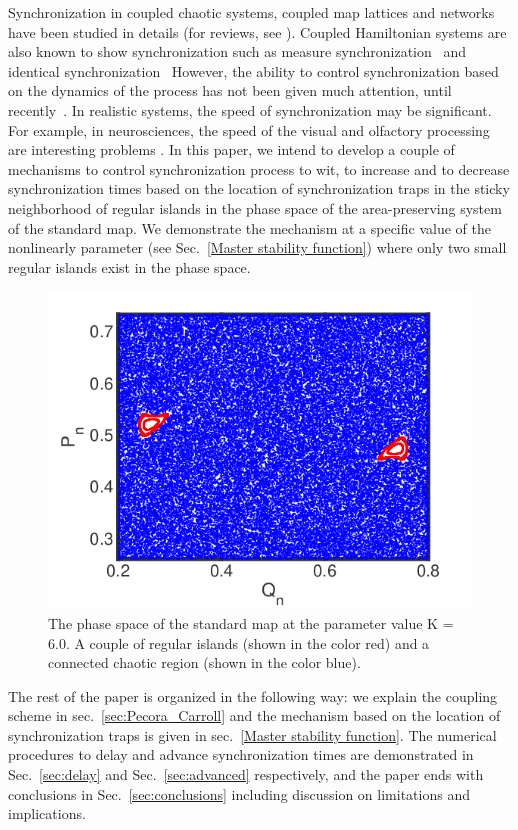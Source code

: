 \documentclass[reprint,amsmath,amssymb,aps,pre]{revtex4-1}
\begin{document}
Synchronization in coupled chaotic systems, coupled map lattices and networks 
have been studied in details (for reviews, see 
\cite{Pecora1998,Boccaletti2002, Pecora2015}). 
Coupled Hamiltonian systems are also known to show synchronization such as 
measure synchronization~\cite{Hampton1999,Wang2003,Vincent2005,Gupta2017} and 
identical synchronization~\cite{Mahata2016,Das2017} However, the ability to control synchronization based on the dynamics of the process has not been given much attention, until 
recently~\cite{Grabow2011,Wang2016}. In realistic systems, the speed of 
synchronization may be significant. For example, in
neurosciences,  the speed of the visual and olfactory processing are 
interesting problems \cite{Thorpe1996,Uchida2003}. In this paper, we intend 
to develop a couple of 
mechanisms to control synchronization process to wit,  to increase and to 
decrease synchronization times based on the location of synchronization traps 
in the sticky neighborhood of regular islands in the phase space of the 
area-preserving system of the standard map. We demonstrate the mechanism at a specific value of the nonlinearly parameter (see Sec.~\ref{Master stability function}) where only two small regular islands exist in the phase space. 
\begin{figure}[t]
	\includegraphics[scale=.45]{Standard_Map.png}
	\caption{\label{fig:Standard_map} \footnotesize The phase space of the standard map at the parameter value K = 6.0. A couple of regular islands (shown in the color red) and a connected chaotic region (shown in the color blue). }
\end{figure}
The rest of the paper is organized in the following way: we explain the 
coupling scheme in sec.~\ref{sec:Pecora_Carroll} and the mechanism based on 
the location of synchronization traps is given in sec.~\ref{Master stability 
function}. The numerical procedures to delay and advance synchronization 
times are demonstrated in Sec.~\ref{sec:delay} and Sec.~\ref{sec:advanced} 
respectively, and the paper ends with conclusions in 
Sec.~\ref{sec:conclusions} including discussion on limitations and 
implications.
\end{document}
